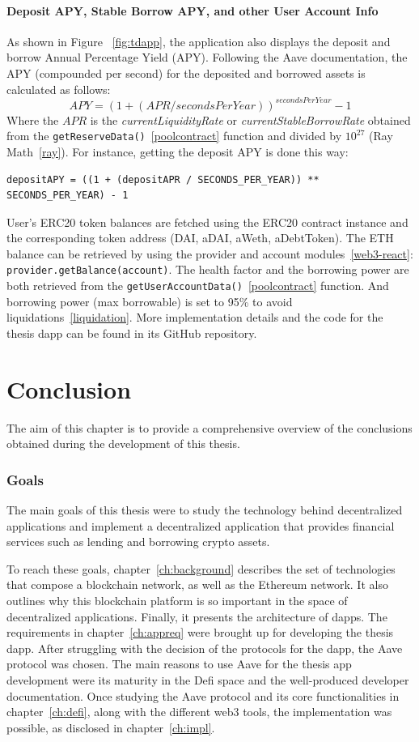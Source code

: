 \documentclass[11pt,a4paper]{report}
\begin{document}
\subsubsection{Deposit APY, Stable Borrow APY, and other User Account Info}
As shown in Figure ~\ref{fig:tdapp}, the application also displays the deposit and borrow Annual Percentage Yield (APY). Following the Aave documentation\cite{apr-apy}, the APY (compounded per second) for the deposited and borrowed assets is calculated as follows:\[ APY = (1 + ({APR}/{secondsPerYear}) )^{secondsPerYear} -1\]
Where the $APR$ is the \textit{currentLiquidityRate} or \textit{currentStableBorrowRate} obtained from the \verb|getReserveData()|~\ref{poolcontract} function and divided by $10^{27}$ (Ray Math~\ref{ray}). For instance, getting the deposit APY is done this way:
\begin{lstlisting}[frame=single]
depositAPY = ((1 + (depositAPR / SECONDS_PER_YEAR)) ** SECONDS_PER_YEAR) - 1
\end{lstlisting}
User's ERC20 token balances are fetched using the ERC20 contract instance and the corresponding token address (DAI, aDAI, aWeth, aDebtToken). The ETH balance can be retrieved by using the provider and account modules~\ref{web3-react}: \\\verb|provider.getBalance(account)|. The health factor and the borrowing power are both retrieved from the \verb|getUserAccountData()|~\ref{poolcontract} function. And borrowing power (max borrowable) is set to 95\% to avoid liquidations~\ref{liquidation}. More implementation details and the code for the thesis dapp can be found in its GitHub repository\cite{thesisDappRepo}.
\chapter{Conclusion} \label{ch:conclusion}
The aim of this chapter is to provide a comprehensive overview of the conclusions obtained during the development of this thesis.

\subsection{Goals}
The main goals of this thesis were to study the technology behind decentralized applications and implement a decentralized application that provides financial services such as lending and borrowing crypto assets.

To reach these goals, chapter~\ref{ch:background} describes the set of technologies that compose a blockchain network, as well as the Ethereum network. It also outlines why this blockchain platform is so important in the space of decentralized applications. Finally, it presents the architecture of dapps. The requirements in chapter~\ref{ch:appreq} were brought up for developing the thesis dapp. After struggling with the decision of the protocols for the dapp, the Aave protocol was chosen. The main reasons to use Aave for the thesis app development were its maturity in the Defi space and the well-produced developer documentation. Once studying the Aave protocol and its core functionalities in chapter~\ref{ch:defi}, along with the different web3 tools, the implementation was possible, as disclosed in chapter~\ref{ch:impl}.
\end{document}
